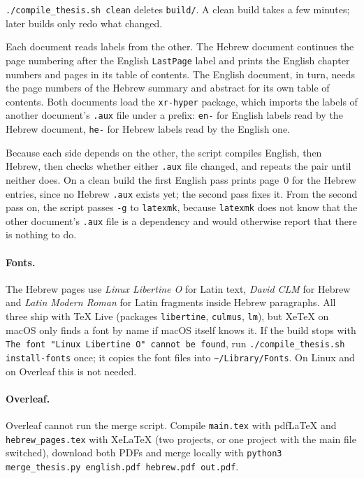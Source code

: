 \texttt{./compile\_thesis.sh clean} deletes \texttt{build/}. A clean build takes a few minutes; later builds only redo what changed.


Each document reads labels from the other.
The Hebrew document continues the page numbering after the English \texttt{LastPage} label and prints the English chapter numbers and pages in its table of contents.
The English document, in turn, needs the page numbers of the Hebrew summary and abstract for its own table of contents.
Both documents load the \texttt{xr-hyper} package, which imports the labels of another document's \texttt{.aux} file under a prefix: \texttt{en-} for English labels read by the Hebrew document, \texttt{he-} for Hebrew labels read by the English one.

Because each side depends on the other, the script compiles English, then Hebrew, then checks whether either \texttt{.aux} file changed, and repeats the pair until neither does.
On a clean build the first English pass prints page~0 for the Hebrew entries, since no Hebrew \texttt{.aux} exists yet; the second pass fixes it.
From the second pass on, the script passes \texttt{-g} to \texttt{latexmk}, because \texttt{latexmk} does not know that the other document's \texttt{.aux} file is a dependency and would otherwise report that there is nothing to do.


\paragraph{Fonts.} The Hebrew pages use \emph{Linux Libertine O} for Latin text, \emph{David CLM} for Hebrew and \emph{Latin Modern Roman} for Latin fragments inside Hebrew paragraphs. All three ship with TeX Live (packages \texttt{libertine}, \texttt{culmus}, \texttt{lm}), but XeTeX on macOS only finds a font by name if macOS itself knows it. If the build stops with \texttt{The font "Linux Libertine O" cannot be found}, run \texttt{./compile\_thesis.sh install-fonts} once; it copies the font files into \texttt{\textasciitilde/Library/Fonts}. On Linux and on Overleaf this is not needed.

\paragraph{Overleaf.} Overleaf cannot run the merge script. Compile \texttt{main.tex} with pdfLaTeX and \texttt{hebrew\_pages.tex} with XeLaTeX (two projects, or one project with the main file switched), download both PDFs and merge locally with \texttt{python3 merge\_thesis.py english.pdf hebrew.pdf out.pdf}.

